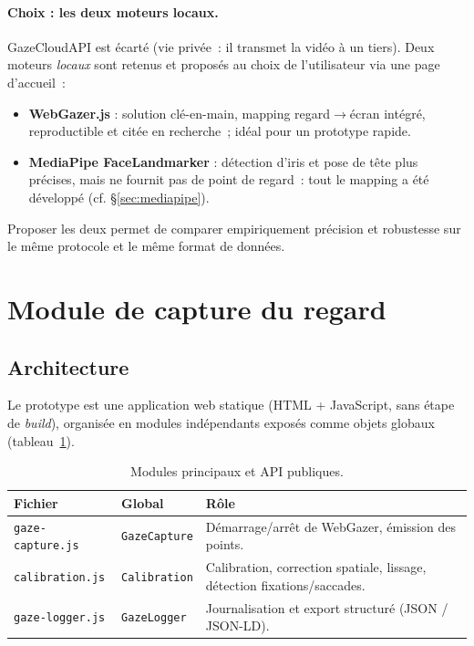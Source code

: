 \documentclass[11pt,a4paper]{article}
\newcommand{\code}[1]{\texttt{\small #1}}
\begin{document}
\paragraph{Choix : les deux moteurs locaux.} GazeCloudAPI est écarté (vie privée~:
il transmet la vidéo à un tiers). Deux moteurs \emph{locaux} sont retenus et
proposés au choix de l'utilisateur via une page d'accueil~:
\begin{itemize}[leftmargin=1.4em]
  \item \textbf{WebGazer.js} : solution clé-en-main, mapping regard$\to$écran intégré,
  reproductible et citée en recherche~; idéal pour un prototype rapide.
  \item \textbf{MediaPipe FaceLandmarker} : détection d'iris et pose de tête plus
  précises, mais ne fournit pas de point de regard~: tout le mapping a été
  développé (cf. §\ref{sec:mediapipe}).
\end{itemize}
Proposer les deux permet de comparer empiriquement précision et robustesse sur le
même protocole et le même format de données.

\section{Module de capture du regard}

\subsection{Architecture}

Le prototype est une application web statique (HTML + JavaScript, sans étape de
\textit{build}), organisée en modules indépendants exposés comme objets globaux
(tableau~\ref{tab:modules}).

\begin{table}[h]
\centering
\begin{tabular}{l l p{7.5cm}}
\toprule
\textbf{Fichier} & \textbf{Global} & \textbf{Rôle} \\
\midrule
\code{gaze-capture.js} & \code{GazeCapture} & Démarrage/arrêt de WebGazer, émission des points. \\
\code{calibration.js}  & \code{Calibration} & Calibration, correction spatiale, lissage, détection fixations/saccades. \\
\code{gaze-logger.js}  & \code{GazeLogger}  & Journalisation et export structuré (JSON / JSON-LD). \\
\bottomrule
\end{tabular}
\caption{Modules principaux et API publiques.}
\label{tab:modules}
\end{table}
\end{document}

